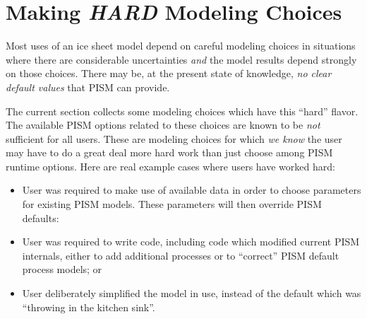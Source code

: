 
\section{Making \emph{HARD} Modeling Choices}
\label{sec:hard-choices}

Most uses of an ice sheet model depend on careful modeling choices in situations where there are considerable uncertainties \emph{and} the model results depend strongly on those choices.  There may be, at the present state of knowledge, \emph{no clear default values} that PISM can provide.

The current section collects some modeling choices which have this ``hard'' flavor.  The available PISM options related to these choices are known to be \emph{not} sufficient for all users.  These are modeling choices for which \emph{we know} the user may have to do a great deal more hard work than just choose among PISM runtime options.  Here are real example cases where users have worked hard:
\begin{itemize}
\item User was required to make use of available data in order to choose parameters for existing PISM models.  These parameters will then override PISM defaults:
\begin{center} %
\end{center}
\item User was required to write code, including code which modified current PISM internals, either to add additional processes or to ``correct'' PISM default process models; or 
\begin{center} %
\end{center}
\item User deliberately simplified the model in use, instead of the default which was ``throwing in the kitchen sink''.
\begin{center} %
\end{center}
\end{itemize}

